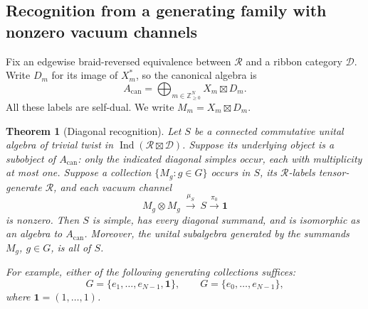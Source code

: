 \documentclass[11pt,a4paper]{article}
\numberwithin{equation}{section}
\newtheorem{theorem}{Theorem}[section]
\theoremstyle{definition}\newtheorem{definition}[theorem]{Definition}
\theoremstyle{remark}\newtheorem{remark}[theorem]{Remark}
\begin{document}
\subsection{Recognition from a generating family with nonzero vacuum channels}

Fix an edgewise braid-reversed equivalence between $\mathcal R$ and a ribbon
category $\mathcal D$.  Write $D_m$ for its image of $X_m^*$, so the canonical
algebra is
\[
 A_{\mathrm{can}}=\bigoplus_{m\in\mathbb Z_{\geq0}^N}X_m\boxtimes D_m.
\]
All these labels are self-dual.  We write $M_m=X_m\boxtimes D_m$.

\begin{theorem}[Diagonal recognition]\label{c:diagonal-recognition}
Let $S$ be a connected commutative unital algebra of trivial twist in
$\operatorname{Ind}(\mathcal R\boxtimes\mathcal D)$.  Suppose its underlying
object is a subobject of $A_{\mathrm{can}}$: only the indicated diagonal
simples occur, each with multiplicity at most one.  Suppose a collection
$\{M_g:g\in G\}$ occurs in $S$, its $\mathcal R$-labels tensor-generate
$\mathcal R$, and each vacuum channel
\[
 M_g\otimes M_g\ \xrightarrow{\mu_S}\ S
        \xrightarrow{\pi_0}\mathbf1
\]
is nonzero.  Then $S$ is simple, has every diagonal summand, and is isomorphic
as an algebra to $A_{\mathrm{can}}$.
Moreover, the unital subalgebra generated by the summands $M_g$, $g\in G$,
is all of $S$.

For example, either of the following generating collections suffices:
\[
 G=\{e_1,\ldots,e_{N-1},\mathbf1\},\qquad
 G=\{e_0,\ldots,e_{N-1}\},
\]
where $\mathbf1=(1,\ldots,1)$.
\end{theorem}
\end{document}
